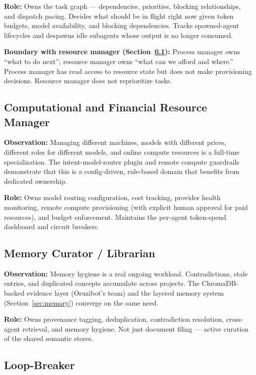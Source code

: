 \documentclass[11pt,a4paper]{article}
\begin{document}
\textbf{Role:} Owns the task graph --- dependencies, priorities, blocking
relationships, and dispatch pacing. Decides what should be in flight right
now given token budgets, model availability, and blocking dependencies.
Tracks spawned-agent lifecycles and despawns idle subagents whose output
is no longer consumed.

\textbf{Boundary with resource manager (Section~\ref{sec:resource-manager}):}
Process manager owns ``what to do next''; resource manager owns ``what can
we afford and where.'' Process manager has read access to resource state
but does not make provisioning decisions. Resource manager does not
reprioritize tasks.

\subsection{Computational and Financial Resource Manager}
\label{sec:resource-manager}

\textbf{Observation:} Managing different machines, models with different
prices, different roles for different models, and online compute resources
is a full-time specialization. The intent-model-router plugin and remote
compute guardrails demonstrate that this is a config-driven, rule-based
domain that benefits from dedicated ownership.

\textbf{Role:} Owns model routing configuration, cost tracking, provider
health monitoring, remote compute provisioning (with explicit human
approval for paid resources), and budget enforcement. Maintains the
per-agent token-spend dashboard and circuit breakers.

\subsection{Memory Curator / Librarian}
\label{sec:curator}

\textbf{Observation:} Memory hygiene is a real ongoing workload.
Contradictions, stale entries, and duplicated concepts accumulate across
projects. The ChromaDB-backed evidence layer (Oruzibot's team) and the
layered memory system (Section~\ref{sec:memory}) converge on the same
need.

\textbf{Role:} Owns provenance tagging, deduplication, contradiction
resolution, cross-agent retrieval, and memory hygiene. Not just document
filing --- active curation of the shared semantic stores.

\subsection{Loop-Breaker}
\label{sec:loop-breaker}
\end{document}
